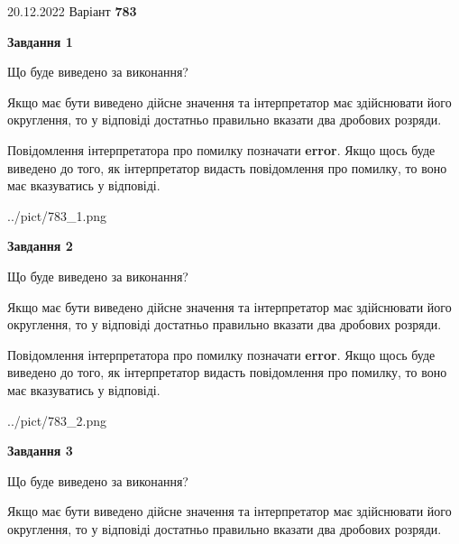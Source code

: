 \documentclass[12pt, ukrainian]{article}
\begin{document}
{20.12.2022 Варіант \No \textbf { 783 }\par}
{
\begin {Large}

{\begin {center}\textbf{Завдання 1}\end {center}}\par
Що буде виведено за виконання? \par

Якщо має бути виведено дійсне значення та інтерпретатор має здійснювати його округлення, 
то у відповіді достатньо правильно вказати два дробових розряди.

Повідомлення інтерпретатора про помилку позначати \textbf{error}.
Якщо щось буде виведено до того, як інтерпретатор видасть повідомлення про помилку, 
то воно має вказуватись у відповіді. \par

\begin{center}
	{../pict/783_1.png}
\end{center}
\newpage

{\begin {center}\textbf{Завдання 2}\end {center}}\par
Що буде виведено за виконання? \par

Якщо має бути виведено дійсне значення та інтерпретатор має здійснювати його округлення, 
то у відповіді достатньо правильно вказати два дробових розряди.

Повідомлення інтерпретатора про помилку позначати \textbf{error}.
Якщо щось буде виведено до того, як інтерпретатор видасть повідомлення про помилку, 
то воно має вказуватись у відповіді. \par

\begin{center}
	{../pict/783_2.png}
\end{center}
\newpage

{\begin {center}\textbf{Завдання 3}\end {center}}\par
Що буде виведено за виконання? \par

Якщо має бути виведено дійсне значення та інтерпретатор має здійснювати його округлення, 
то у відповіді достатньо правильно вказати два дробових розряди.


\end{Large}}
\end{document}
